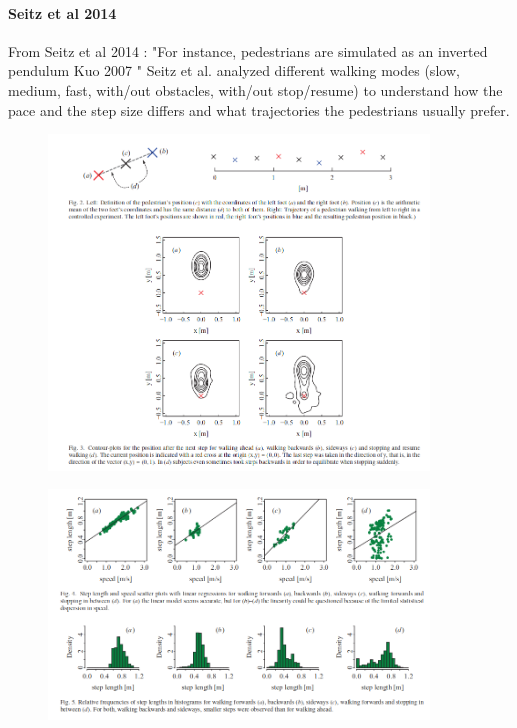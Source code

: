 \documentclass[11pt]{article}
\begin{document}
\paragraph{Seitz et al 2014 \cite{Seitz2014}}

From Seitz et al 2014 \cite{Seitz2014}:
"For instance, pedestrians are simulated as an inverted pendulum Kuo 2007 \cite{Kuo2007}"
Seitz et al. \cite{Seitz2014} analyzed different walking modes (slow, medium, fast, with/out obstacles, with/out stop/resume) to understand how the pace and the step size differs and what trajectories the pedestrians usually prefer. 

\begin{figure}[H]
\includegraphics[width=0.9\textwidth]{images/steitz_steps_distribution.png}
\end{figure}

\begin{figure}[H]
\includegraphics[width=0.9\textwidth]{images/steitz_speed_vs_step_size.png}
\end{figure}
\end{document}
